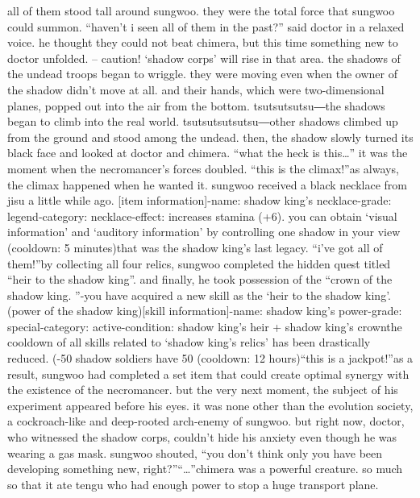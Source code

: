 all of them stood tall around sungwoo.
 they were the total force that sungwoo could summon.
“haven’t i seen all of them in the past?” said doctor in a relaxed voice.
 he thought they could not beat chimera, but this time something new to doctor unfolded.
– caution! ‘shadow corps’ will rise in that area.
the shadows of the undead troops began to wriggle.
 they were moving even when the owner of the shadow didn’t move at all.
 and their hands, which were two-dimensional planes, popped out into the air from the bottom.
tsutsutsutsu―the shadows began to climb into the real world.
tsutsutsutsutsu―other shadows climbed up from the ground and stood among the undead.
then, the shadow slowly turned its black face and looked at doctor and chimera.
“what the heck is this…”
it was the moment when the necromancer’s forces doubled.
“this is the climax!”as always, the climax happened when he wanted it.
sungwoo received a black necklace from jisu a little while ago.
[item information]-name: shadow king’s necklace-grade: legend-category: necklace-effect: increases stamina (+6).
 you can obtain ‘visual information’ and ‘auditory information’ by controlling one shadow in your view (cooldown: 5 minutes)that was the shadow king’s last legacy.
“i’ve got all of them!”by collecting all four relics, sungwoo completed the hidden quest titled “heir to the shadow king”.
 and finally, he took possession of the “crown of the shadow king.
”-you have acquired a new skill as the ‘heir to the shadow king’.
 (power of the shadow king)[skill information]-name: shadow king’s power-grade: special-category: active-condition: shadow king’s heir + shadow king’s crownthe cooldown of all skills related to ‘shadow king’s relics’ has been drastically reduced.
 (-50%
shadow soldiers have 50%
 (cooldown: 12 hours)“this is a jackpot!”as a result, sungwoo had completed a set item that could create optimal synergy with the existence of the necromancer.
but the very next moment, the subject of his experiment appeared before his eyes.
it was none other than the evolution society, a cockroach-like and deep-rooted arch-enemy of sungwoo.
but right now, doctor, who witnessed the shadow corps, couldn’t hide his anxiety even though he was wearing a gas mask.
sungwoo shouted, “you don’t think only you have been developing something new, right?”“…”chimera was a powerful creature.
 so much so that it ate tengu who had enough power to stop a huge transport plane.
